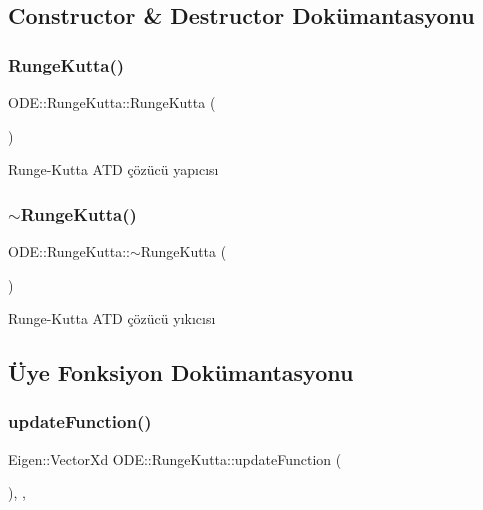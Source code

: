 \subsection{Constructor \& Destructor Dokümantasyonu}
\mbox{\label{classODE_1_1RungeKutta_ae19a22749e715723cb1414ece5f7bd88}} 
\subsubsection{\texorpdfstring{RungeKutta()}{RungeKutta()}}
{\footnotesize\ttfamily O\+D\+E\+::\+Runge\+Kutta\+::\+Runge\+Kutta (\begin{DoxyParamCaption}{ }\end{DoxyParamCaption})}

Runge-\/\+Kutta A\+TD çözücü yapıcısı \mbox{\label{classODE_1_1RungeKutta_ac1514d8b68d46e1cc51dfa1f52003af0}} 
\subsubsection{\texorpdfstring{$\sim$RungeKutta()}{~RungeKutta()}}
{\footnotesize\ttfamily O\+D\+E\+::\+Runge\+Kutta\+::$\sim$\+Runge\+Kutta (\begin{DoxyParamCaption}{ }\end{DoxyParamCaption})\hspace{0.3cm}{\ttfamily [virtual]}}

Runge-\/\+Kutta A\+TD çözücü yıkıcısı 

\subsection{Üye Fonksiyon Dokümantasyonu}
\mbox{\label{classODE_1_1RungeKutta_a545126adbad4dcf9294cc2623117edab}} 
\subsubsection{\texorpdfstring{updateFunction()}{updateFunction()}}
{\footnotesize\ttfamily Eigen\+::\+Vector\+Xd O\+D\+E\+::\+Runge\+Kutta\+::update\+Function (\begin{DoxyParamCaption}{ }\end{DoxyParamCaption})\hspace{0.3cm}{\ttfamily [override]}, {\ttfamily [protected]}, {\ttfamily [virtual]}}

